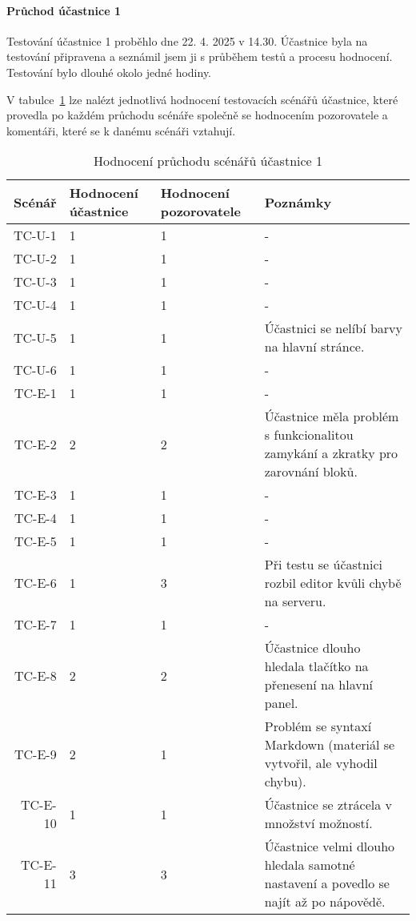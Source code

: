 \paragraph{Průchod účastnice 1}

Testování účastnice 1 proběhlo dne 22. 4. 2025 v 14.30. 
Účastnice byla na testování připravena a seznámil jsem ji s průběhem testů a procesu hodnocení. 
Testování bylo dlouhé okolo jedné hodiny.

V tabulce~\ref{tab:hodnoceniPruchoduUcastnika1} lze nalézt jednotlivá hodnocení testovacích scénářů účastnice, které provedla po každém průchodu scénáře společně se hodnocením pozorovatele a komentáři, které se k danému scénáři vztahují.

\begin{longtable}{r|p{2cm}|p{2cm}|p{6cm}}
    \caption{Hodnocení průchodu scénářů účastnice 1}\label{tab:hodnoceniPruchoduUcastnika1}\\
Scénář & Hodnocení účastnice & Hodnocení pozorovatele & Poznámky\\\hline\hline
TC-U-1   & 1 & 1 & - \\\hline
TC-U-2   & 1 & 1 & - \\\hline
TC-U-3   & 1 & 1 & - \\\hline
TC-U-4   & 1 & 1 & -  \\\hline
TC-U-5   & 1 & 1 & Účastnici se nelíbí barvy na hlavní stránce. \\\hline
TC-U-6   & 1 & 1 & - \\\hline
TC-E-1   & 1 & 1 & - \\\hline
TC-E-2   & 2 & 2 & Účastnice měla problém s funkcionalitou zamykání a zkratky pro zarovnání bloků.  \\\hline
TC-E-3   & 1 & 1 & - \\\hline
TC-E-4   & 1 & 1 & - \\\hline
TC-E-5   & 1 & 1 & - \\\hline
TC-E-6   & 1 & 3 & Při testu se účastnici rozbil editor kvůli chybě na serveru.  \\\hline
TC-E-7   & 1 & 1 & - \\\hline
TC-E-8   & 2 & 2 & Účastnice dlouho hledala tlačítko na přenesení na hlavní panel. \\\hline
TC-E-9   & 2 & 1 & Problém se syntaxí Markdown (materiál se vytvořil, ale vyhodil chybu). \\\hline
TC-E-10  & 1 & 1 & Účastnice se ztrácela v množství možností. \\\hline
TC-E-11  & 3 & 3 & Účastnice velmi dlouho hledala samotné nastavení a povedlo se najít až po nápovědě. \\\hline

\end{longtable}
